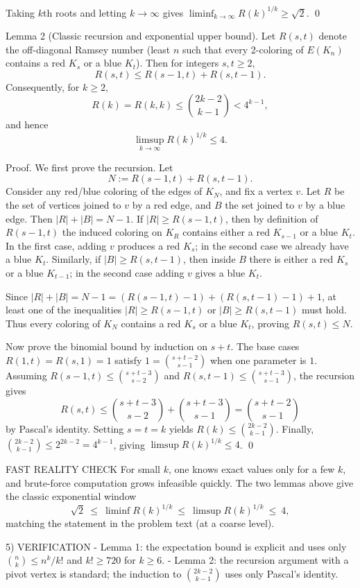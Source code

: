 Taking $k$th roots and letting $k\to\infty$ gives $\liminf_{k\to\infty} R(k)^{1/k}\ge \sqrt2$. \qed

Lemma 2 (Classic recursion and exponential upper bound).
Let $R(s,t)$ denote the off-diagonal Ramsey number (least $n$ such that every 2-coloring of $E(K_n)$ contains a red $K_s$ or a blue $K_t$).
Then for integers $s,t\ge 2$,
\[R(s,t)\le R(s-1,t)+R(s,t-1).\]
Consequently, for $k\ge 2$,
\[R(k)=R(k,k)\le \binom{2k-2}{k-1} < 4^{k-1},\]
and hence
\[\limsup_{k\to\infty} R(k)^{1/k}\le 4.\]

Proof.
We first prove the recursion. Let
\[N:=R(s-1,t)+R(s,t-1).\]
Consider any red/blue coloring of the edges of $K_N$, and fix a vertex $v$.
Let $R$ be the set of vertices joined to $v$ by a red edge, and $B$ the set joined to $v$ by a blue edge.
Then $|R|+|B|=N-1$.
If $|R|\ge R(s-1,t)$, then by definition of $R(s-1,t)$ the induced coloring on $K_R$ contains either a red $K_{s-1}$ or a blue $K_t$.
In the first case, adding $v$ produces a red $K_s$; in the second case we already have a blue $K_t$.
Similarly, if $|B|\ge R(s,t-1)$, then inside $B$ there is either a red $K_s$ or a blue $K_{t-1}$; in the second case adding $v$ gives a blue $K_t$.

Since $|R|+|B|=N-1=(R(s-1,t)-1)+(R(s,t-1)-1)+1$, at least one of the inequalities
$|R|\ge R(s-1,t)$ or $|B|\ge R(s,t-1)$ must hold.
Thus every coloring of $K_N$ contains a red $K_s$ or a blue $K_t$, proving $R(s,t)\le N$.

Now prove the binomial bound by induction on $s+t$.
The base cases $R(1,t)=R(s,1)=1$ satisfy $1=\binom{s+t-2}{s-1}$ when one parameter is $1$.
Assuming $R(s-1,t)\le \binom{s+t-3}{s-2}$ and $R(s,t-1)\le \binom{s+t-3}{s-1}$, the recursion gives
\[R(s,t)\le \binom{s+t-3}{s-2}+\binom{s+t-3}{s-1}=\binom{s+t-2}{s-1}\]
by Pascal's identity.
Setting $s=t=k$ yields $R(k)\le \binom{2k-2}{k-1}$.
Finally, $\binom{2k-2}{k-1}\le 2^{2k-2}=4^{k-1}$, giving $\limsup R(k)^{1/k}\le 4$. \qed

FAST REALITY CHECK
For small $k$, one knows exact values only for a few $k$, and brute-force computation grows infeasible quickly.
The two lemmas above give the classic exponential window
\[\sqrt2\ \le\ \liminf R(k)^{1/k}\ \le\ \limsup R(k)^{1/k}\ \le\ 4,\]
matching the statement in the problem text (at a coarse level).

5) VERIFICATION
- Lemma 1: the expectation bound is explicit and uses only $\binom{n}{k}\le n^k/k!$ and $k!\ge 720$ for $k\ge 6$.
- Lemma 2: the recursion argument with a pivot vertex is standard; the induction to $\binom{2k-2}{k-1}$ uses only Pascal's identity.

